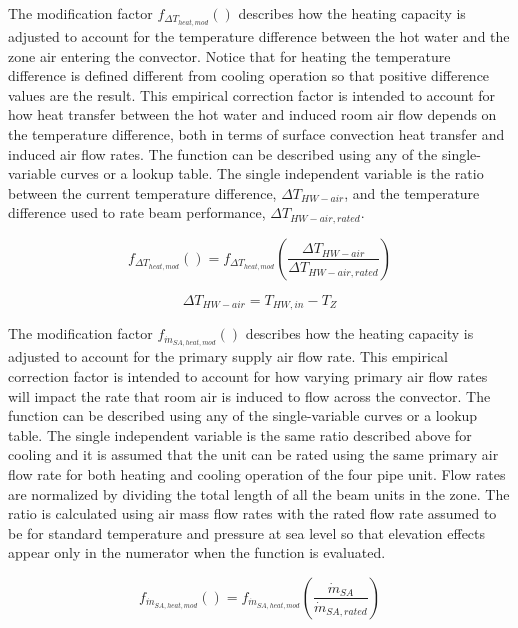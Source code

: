 The modification factor \(f_{ \Delta T_{heat,mod} }()\) describes how the heating capacity is adjusted to account for the temperature difference between the hot water and the zone air entering the convector. Notice that for heating the temperature difference is defined different from cooling operation so that positive difference values are the result. This empirical correction factor is intended to account for how heat transfer between the hot water and induced room air flow depends on the temperature difference, both in terms of surface convection heat transfer and induced air flow rates. The function can be described using any of the single-variable curves or a lookup table. The single independent variable is the ratio between the current temperature difference, \(\Delta T_{HW-air}\), and the temperature difference used to rate beam performance, \(\Delta T_{HW-air,rated}\).

\begin{equation}
{f_{ \Delta T_{heat,mod} }()} = f_{ \Delta T_{heat,mod} }\left(\frac{\Delta T_{HW-air}}{\Delta T_{HW-air,rated}}\right)
\end{equation}

\begin{equation}
{\Delta T_{HW-air}} = {T_{HW,in}} -{T_{Z}}
\end{equation}

The modification factor \(f_{\dot m_{SA,heat,mod}}()\) describes how the heating capacity is adjusted to account for the primary supply air flow rate. This empirical correction factor is intended to account for how varying primary air flow rates will impact the rate that room air is induced to flow across the convector. The function can be described using any of the single-variable curves or a lookup table. The single independent variable is the same ratio described above for cooling and it is assumed that the unit can be rated using the same primary air flow rate for both heating and cooling operation of the four pipe unit. Flow rates are normalized by dividing the total length of all the beam units in the zone. The ratio is calculated using air mass flow rates with the rated flow rate assumed to be for standard temperature and pressure at sea level so that elevation effects appear only in the numerator when the function is evaluated.

\begin{equation}
{f_{\dot m_{SA,heat,mod}}()} = f_{\dot m_{SA,heat,mod}}\left(\frac{{\dot m_{SA}}}{{\dot m_{SA,rated}} }\right)
\end{equation}

